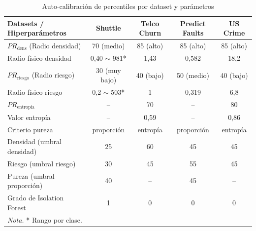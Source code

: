 \documentclass{article}
\begin{document}
\begin{table}[ht]
    \centering
    \caption{Auto-calibración de percentiles por dataset y parámetros}
    \label{tab:autocalibracion}
    \small 
    \begin{tabular}{lcccc}
        \toprule
        \textbf{Datasets / Hiperparámetros} & \textbf{Shuttle} & \textbf{Telco Churn} & \textbf{Predict Faults} & \textbf{US Crime} \\
        \midrule
        $PR_{\text{dens}}$ (Radio densidad) & 70 (medio) & 85 (alto) & 85 (alto) & 85 (alto) \\
        Radio físico densidad & 0,40 $\sim$ 981* & 1,43 & 0,582 & 18,2 \\
        $PR_{\text{riesgo}}$ (Radio riesgo) & 30 (muy bajo) & 40 (bajo) & 50 (medio) & 40 (bajo) \\
        Radio físico riesgo & 0,2 $\sim$ 503* & 1 & 0,319 & 6,8 \\
        \addlinespace
        $PR_{\text{entropía}}$ & -- & 70 & -- & 80 \\
        Valor entropía & -- & 0,59 & -- & 0,86 \\
        Criterio pureza & proporción & entropía & proporción & entropía \\
        \addlinespace
        Densidad (umbral densidad) & 25 & 60 & 45 & 45 \\
        Riesgo (umbral riesgo) & 30 & 45 & 55 & 45 \\
        Pureza (umbral proporción) & 40 & -- & 45 & -- \\
        Grado de Isolation Forest & 1 & 0 & 0 & 0 \\
        \bottomrule
        \multicolumn{5}{l}{\textit{Nota.} * Rango por clase.}
    \end{tabular}
\end{table}
\end{document}
